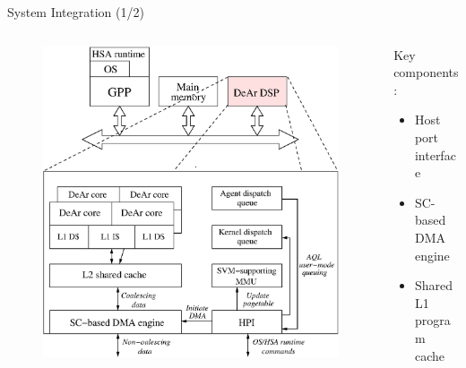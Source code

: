 \documentclass{beamer}
\begin{document}
\begin{CJK}{UTF8}{bkai}
    \begin{frame}{System Integration (1/2)}
        \begin{columns}
            \begin{column}{0.6\textwidth}
                \begin{figure}[!ht] 
                    \centering
                    \includegraphics[width=1.0\textwidth]{./figs/archi.eps}
                    \label{fig:archi}
                \end{figure}
            \end{column}
            \begin{column}{0.4\textwidth}
            Key components:
                \begin{itemize}
                    \item Host port interface~\cite{hpi}
                    \item SC-based DMA engine~\cite{sc}
                    \item Shared L1 program cache~\cite{kelly2004shared}
                \end{itemize}
            \end{column}
        \end{columns}
    \end{frame}


\end{CJK}
\end{document}
